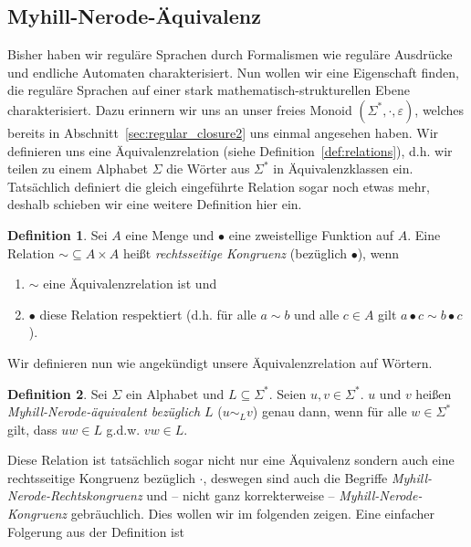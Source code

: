 \documentclass[11pt, a4paper]{article}
\theoremstyle{definition}
\newtheorem{definition}{Definition}[section]
\theoremstyle{plain}
\numberwithin{equation}{section}
\begin{document}
\subsection{Myhill-Nerode-Äquivalenz}\label{sec:regular_myhill-nerode}
Bisher haben wir reguläre Sprachen durch Formalismen wie reguläre Ausdrücke und endliche Automaten charakterisiert. Nun wollen wir eine Eigenschaft finden, die reguläre Sprachen auf einer stark mathematisch-strukturellen Ebene charakterisiert. Dazu erinnern wir uns an unser freies Monoid $(\Sigma^\ast, \cdot, \varepsilon)$, welches bereits in Abschnitt~\ref{sec:regular_closure2} uns einmal angesehen haben. Wir definieren uns eine Äquivalenzrelation (siehe Definition~\ref{def:relations}), d.h. wir teilen zu einem Alphabet $\Sigma$ die Wörter aus $\Sigma^\ast$ in Äquivalenzklassen ein. Tatsächlich definiert die gleich eingeführte Relation sogar noch etwas mehr, deshalb schieben wir eine weitere Definition hier ein.
\begin{definition}
	Sei $A$ eine Menge und $\bullet$ eine zweistellige Funktion auf $A$. Eine Relation $\sim \subseteq A \times A$ heißt \textit{rechtsseitige Kongruenz} (bezüglich $\bullet$), wenn
	\begin{enumerate}
		\item $\sim$ eine Äquivalenzrelation ist und
		\item $\bullet$ diese Relation respektiert (d.h. für alle $a \sim b$ und alle $c \in A$ gilt $a \bullet c \sim b \bullet c$).
	\end{enumerate}
\end{definition}
Wir definieren nun wie angekündigt unsere Äquivalenzrelation auf Wörtern.
\begin{definition}
	Sei $\Sigma$ ein Alphabet und $L \subseteq \Sigma^\ast$. Seien $u, v \in \Sigma^\ast$. $u$ und $v$ heißen \textit{Myhill-Nerode-äquivalent bezüglich $L$} ($u \sim_L v$) genau dann, wenn für alle $w \in \Sigma^\ast$ gilt, dass $uw \in L$ g.d.w. $vw \in L$.
\end{definition}
Diese Relation ist tatsächlich sogar nicht nur eine Äquivalenz sondern auch eine rechtsseitige Kongruenz bezüglich $\cdot$, deswegen sind auch die Begriffe \textit{Myhill-Nerode-Rechtskongruenz} und -- nicht ganz korrekterweise -- \textit{Myhill-Nerode-Kongruenz} gebräuchlich. Dies wollen wir im folgenden zeigen.
Eine einfacher Folgerung aus der Definition ist
\end{document}
